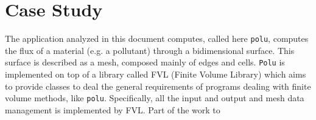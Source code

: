 \section{Case Study}

The application analyzed in this document computes, called here \texttt{polu}, computes the flux of a material (e.g. a pollutant) through a bidimensional surface. This surface is described as a mesh, composed mainly of edges and cells. \texttt{Polu} is implemented on top of a library called FVL (Finite Volume Library) which aims to provide classes to deal the general requirements of programs dealing with finite volume methods, like \texttt{polu}. Specifically, all the input and output and mesh data management is implemented by FVL. Part of the work to 




